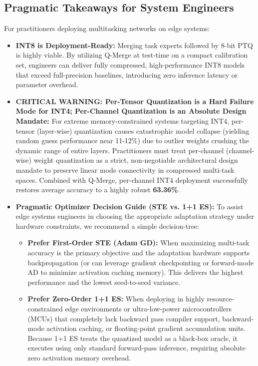 \subsection{Pragmatic Takeaways for System Engineers}
For practitioners deploying multitasking networks on edge systems:
\begin{itemize}
    \item \textbf{INT8 is Deployment-Ready:} Merging task experts followed by 8-bit PTQ is highly viable. By utilizing Q-Merge at test-time on a compact calibration set, engineers can deliver fully compressed, high-performance INT8 models that exceed full-precision baselines, introducing zero inference latency or parameter overhead.
    \item \textbf{CRITICAL WARNING: Per-Tensor Quantization is a Hard Failure Mode for INT4; Per-Channel Quantization is an Absolute Design Mandate:} For extreme memory-constrained systems targeting INT4, per-tensor (layer-wise) quantization causes catastrophic model collapse (yielding random guess performance near 11-12\%) due to outlier weights crushing the dynamic range of entire layers. Practitioners must treat per-channel (channel-wise) weight quantization as a strict, non-negotiable architectural design mandate to preserve linear mode connectivity in compressed multi-task spaces. Combined with Q-Merge, per-channel INT4 deployment successfully restores average accuracy to a highly robust \textbf{63.36\%}.
    \item \textbf{Pragmatic Optimizer Decision Guide (STE vs. 1+1 ES):} To assist edge systems engineers in choosing the appropriate adaptation strategy under hardware constraints, we recommend a simple decision-tree:
    \begin{itemize}
        \item \textbf{Prefer First-Order STE (Adam GD):} When maximizing multi-task accuracy is the primary objective and the adaptation hardware supports backpropagation (or can leverage gradient checkpointing or forward-mode AD to minimize activation caching memory). This delivers the highest performance and the lowest seed-to-seed variance.
        \item \textbf{Prefer Zero-Order 1+1 ES:} When deploying in highly resource-constrained edge environments or ultra-low-power microcontrollers (MCUs) that completely lack backward pass compiler support, backward-mode activation caching, or floating-point gradient accumulation units. Because 1+1 ES treats the quantized model as a black-box oracle, it executes using only standard forward-pass inference, requiring absolute zero activation memory overhead.
    \end{itemize}
\end{itemize}

